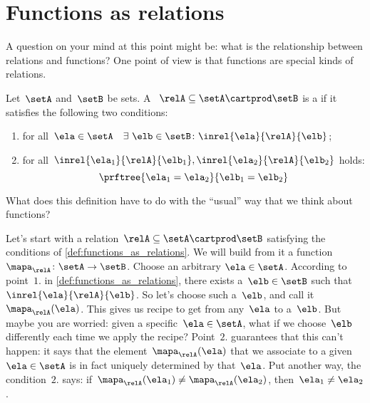 

\section{Functions as relations}

A question on your mind at this point might be: what is the relationship between relations and functions?
One point of view is that functions are special kinds of relations.

\begin{definition}
    \label{def:functions_as_relations}
    Let~$\setA$ and~$\setB$ be sets.
    A ~$\relA \subseteq \setA \cartprod \setB$ is a \emph{} if it satisfies the following two conditions:
    \begin{enumerate}
        \item for all~$\ela \in \setA \quad \exists \ \elb \in \setB\colon  \inrel{\ela}{\relA}{\elb}$;
        \item for all~$\inrel{\ela_1}{\relA}{\elb_1}, \inrel{\ela_2}{\relA}{\elb_2}$ holds:
        \begin{equation*}
            \prftree{\ela_1 = \ela_2}{\elb_1 = \elb_2}
        \end{equation*}
    \end{enumerate}
\end{definition}

What does this definition have to do with the ``usual'' way that we think about functions?

Let's start with a relation~$\relA \subseteq \setA \cartprod \setB$ satisfying the conditions of \cref{def:functions_as_relations}.
We will build from it a function~$\mapa_\relA \colon \setA \to \setB$.
Choose an arbitrary $\ela \in \setA$.
According to point~$1.$ in \cref{def:functions_as_relations}, there exists a~$\elb \in \setB$ such that~$\inrel{\ela}{\relA}{\elb}$.
So let's choose such a~$\elb$, and call it~$\mapa_\relA(\ela)$.
This gives us recipe to get from any~$\ela$ to a~$\elb$.
But maybe you are worried: given a specific~$\ela \in \setA$, what if we choose~$\elb$ differently each time we apply the recipe?
Point~$2.$ guarantees that this can't happen: it says that the element~$\mapa_\relA(\ela)$ that we associate to a given~$\ela \in \setA$ is in fact uniquely determined by that~$\ela$.
Put another way, the condition~$2.$ says: if~$\mapa_\relA(\ela_1) \neq \mapa_\relA(\ela_2)$, then~$\ela_1 \neq\ela_2$.

